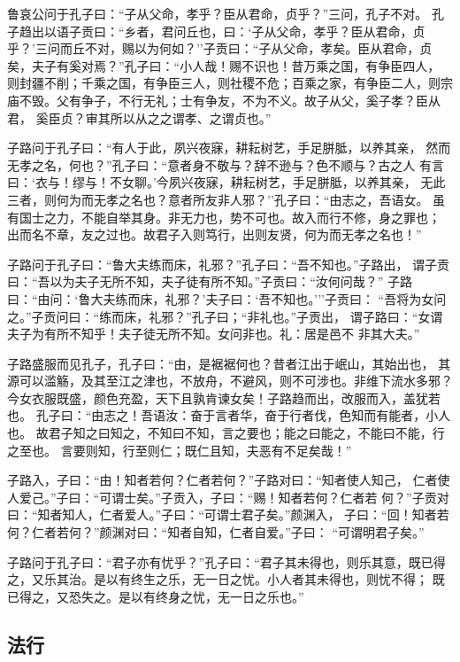 \documentclass[]{article}
\begin{document}
鲁哀公问于孔子曰：``子从父命，孝乎？臣从君命，贞乎？''三问，孔子不对。
孔子趋出以语子贡曰：``乡者，君问丘也，曰：`子从父命，孝乎？臣从君命，贞
乎？'三问而丘不对，赐以为何如？''子贡曰：``子从父命，孝矣。臣从君命，贞
矣，夫子有奚对焉？''孔子曰：``小人哉！赐不识也！昔万乘之国，有争臣四人，
则封疆不削；千乘之国，有争臣三人，则社稷不危；百乘之家，有争臣二人，则宗
庙不毁。父有争子，不行无礼；士有争友，不为不义。故子从父，奚子孝？臣从君，
奚臣贞？审其所以从之之谓孝、之谓贞也。''

子路问于孔子曰：``有人于此，夙兴夜寐，耕耘树艺，手足胼胝，以养其亲，
然而无孝之名，何也？''孔子曰：``意者身不敬与？辞不逊与？色不顺与？古之人
有言曰：`衣与！缪与！不女聊。'今夙兴夜寐，耕耘树艺，手足胼胝，以养其亲，
无此三者，则何为而无孝之名也？意者所友非人邪？''孔子曰：``由志之，吾语女。
虽有国士之力，不能自举其身。非无力也，势不可也。故入而行不修，身之罪也；
出而名不章，友之过也。故君子入则笃行，出则友贤，何为而无孝之名也！''

子路问于孔子曰：``鲁大夫练而床，礼邪？''孔子曰：``吾不知也。''子路出，
谓子贡曰：``吾以为夫子无所不知，夫子徒有所不知。''子贡曰：``汝何问哉？''
子路曰：``由问：`鲁大夫练而床，礼邪？'夫子曰：`吾不知也。'''子贡曰：
``吾将为女问之。''子贡问曰：``练而床，礼邪？''孔子曰；``非礼也。''子贡出，
谓子路曰：``女谓夫子为有所不知乎！夫子徒无所不知。女问非也。礼：居是邑不
非其大夫。''

子路盛服而见孔子，孔子曰：``由，是裾裾何也？昔者江出于岷山，其始出也，
其源可以滥觞，及其至江之津也，不放舟，不避风，则不可涉也。非维下流水多邪？
今女衣服既盛，颜色充盈，天下且孰肯谏女矣！子路趋而出，改服而入，盖犹若也。
孔子曰：``由志之！吾语汝：奋于言者华，奋于行者伐，色知而有能者，小人也。
故君子知之曰知之，不知曰不知，言之要也；能之曰能之，不能曰不能，行之至也。
言要则知，行至则仁；既仁且知，夫恶有不足矣哉！''

子路入，子曰：``由！知者若何？仁者若何？''子路对曰：``知者使人知己，
仁者使人爱己。''子曰：``可谓士矣。''子贡入，子曰：``赐！知者若何？仁者若
何？''子贡对曰：``知者知人，仁者爱人。''子曰：``可谓士君子矣。''颜渊入，
子曰：``回！知者若何？仁者若何？''颜渊对曰：``知者自知，仁者自爱。''子曰：
``可谓明君子矣。''

子路问于孔子曰：``君子亦有忧乎？''孔子曰：``君子其未得也，则乐其意，既已得之，又乐其治。是以有终生之乐，无一日之忧。小人者其未得也，则忧不得；
既已得之，又恐失之。是以有终身之忧，无一日之乐也。''

\hypertarget{header-n128}{%
\subsection{法行}\label{header-n128}}
\end{document}
